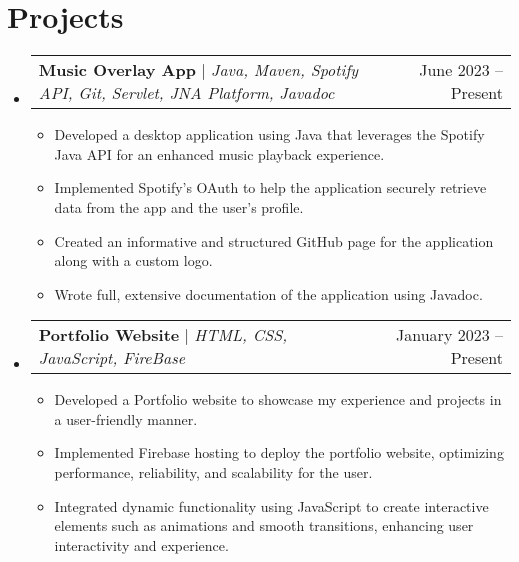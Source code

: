 \documentclass[letterpaper,11pt]{article}
\makeatletter
\newcommand{\resumeItem}[1]{
  \item\small{
    {#1 \vspace{-2pt}}
  }
}
\newcommand{\resumeSubheading}[4]{
  \vspace{-2pt}\item
    \begin{tabular*}{0.97\textwidth}[t]{l@{\extracolsep{\fill}}r}
      \textbf{#1} & #2 \\
      \textit{\small#3} & \textit{\small #4} \\
    \end{tabular*}\vspace{-7pt}
}
\newcommand{\resumeProjectHeading}[2]{
    \item
    \begin{tabular*}{0.97\textwidth}{l@{\extracolsep{\fill}}r}
      \small#1 & #2 \\
    \end{tabular*}\vspace{-7pt}
}
\newcommand{\resumeSubHeadingListStart}{\begin{itemize}[leftmargin=0.15in, label={}]}
\newcommand{\resumeSubHeadingListEnd}{\end{itemize}}
\newcommand{\resumeItemListStart}{\begin{itemize}}
\newcommand{\resumeItemListEnd}{\end{itemize}\vspace{-5pt}}
\makeatother
\begin{document}
\section{Projects}
    \resumeSubHeadingListStart
      \resumeProjectHeading
          {\textbf{Music Overlay App} $|$ \emph{Java, Maven, Spotify API, Git, Servlet, JNA Platform, Javadoc}}{June 2023 -- Present}
          \resumeItemListStart
            \resumeItem{Developed a desktop application using Java that leverages the Spotify Java API for an enhanced music playback experience.}
            \resumeItem{Implemented Spotify's OAuth to help the application securely retrieve data from the app and the user's profile.}
            \resumeItem{Created an informative and structured GitHub page for the application along with a custom logo.}
            \resumeItem{Wrote full, extensive documentation of the application using Javadoc.}
          \resumeItemListEnd
      \resumeProjectHeading
          {\textbf{Portfolio Website} $|$ \emph{HTML, CSS, JavaScript, FireBase}}{January 2023 -- Present}
          \resumeItemListStart
            \resumeItem{Developed a Portfolio website to showcase my experience and projects in a user-friendly manner.}
            \resumeItem{Implemented Firebase hosting to deploy the portfolio website, optimizing performance, reliability, and scalability for the user.}
            \resumeItem{Integrated dynamic functionality using JavaScript to create interactive elements such as animations and smooth transitions, enhancing user interactivity and experience.}
          \resumeItemListEnd
    \resumeSubHeadingListEnd



%
\end{document}
